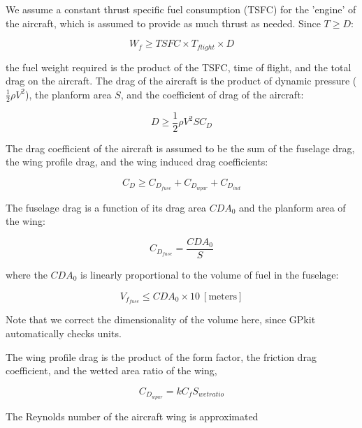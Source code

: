 We assume a constant thrust specific fuel consumption (TSFC) for the 'engine' of the aircraft, which is assumed to provide as much thrust as needed. Since $T \geq D$:

\begin{equation}
    W_f \geq TSFC \times T_{flight} \times D
\end{equation}

the fuel weight required is the product of the TSFC, time of flight, and the total drag on the aircraft. The drag of the aircraft is the product of dynamic pressure ($\frac{1}{2} \rho V^2$), the planform area $S$, and the coefficient of drag of the aircraft:

\begin{equation} 
    D \geq \frac{1}{2}  \rho V^2 S  C_D
\label{e:d}
\end{equation}

The drag coefficient of the aircraft is assumed to be the sum of the fuselage drag, the wing profile drag, and the wing induced drag coefficients: 

\begin{equation}
    C_D \geq C_{D_{fuse}} + C_{D_{wpar}} + C_{D_{ind}}
\label{e:cd}
\end{equation}

The fuselage drag is a function of its drag area $CDA_0$ and the planform area of the wing:

\begin{equation}
    C_{D_{fuse}} = \frac{CDA_0}{S}
\label{e:cdfuse}
\end{equation}

where the $CDA_0$ is linearly proportional to the volume of fuel in the fuselage:

\begin{equation}
    V_{f_{fuse}} \leq CDA_0 \times 10 ~\mathrm{[meters]}
\label{e:vffuse}
\end{equation}

Note that we correct the dimensionality of the volume here, since GPkit automatically checks units. 

The wing profile drag is the product of the form factor, the friction drag coefficient, and the wetted area ratio of the wing, 

\begin{equation}
    C_{D_{wpar}} = k C_f S_{wetratio}
\label{e:cdwpar}
\end{equation}

The Reynolds number of the aircraft wing is approximated

